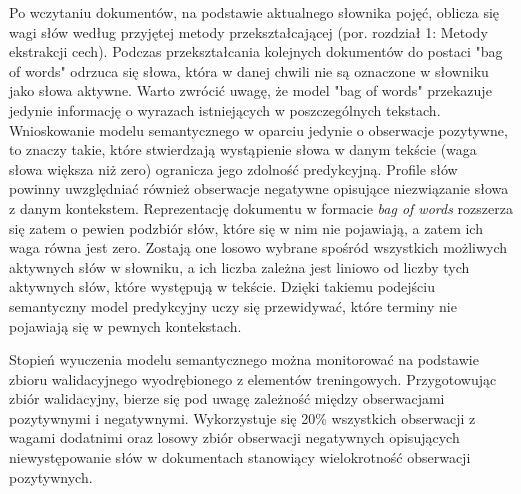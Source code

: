 \documentclass{pracamgr}
\begin{document}
Po wczytaniu dokumentów, na podstawie aktualnego słownika pojęć, oblicza się wagi słów według przyjętej metody przekształcającej (por. rozdział 1: Metody ekstrakcji cech). Podczas przekształcania kolejnych dokumentów do postaci "bag of words" odrzuca się słowa, która w danej chwili nie są oznaczone w słowniku jako słowa aktywne. Warto zwrócić uwagę, że model "bag of words" przekazuje jedynie informację o wyrazach istniejących w poszczególnych tekstach. Wnioskowanie modelu semantycznego w oparciu jedynie o obserwacje pozytywne, to znaczy takie, które stwierdzają wystąpienie słowa w danym tekście (waga słowa większa niż zero) ogranicza jego zdolność predykcyjną. Profile słów powinny uwzględniać również obserwacje negatywne opisujące niezwiązanie słowa z danym kontekstem. Reprezentację dokumentu w formacie \textit{bag of words} rozszerza się zatem o pewien podzbiór słów, które się w nim nie pojawiają, a zatem ich waga równa jest zero. Zostają one losowo wybrane spośród wszystkich możliwych aktywnych słów w słowniku, a ich liczba zależna jest liniowo od liczby tych aktywnych słów, które występują w tekście. Dzięki takiemu podejściu semantyczny model predykcyjny uczy się przewidywać, które terminy nie pojawiają się w pewnych kontekstach.

Stopień wyuczenia modelu semantycznego można monitorować na podstawie zbioru walidacyjnego wyodrębionego z elementów treningowych. Przygotowując zbiór walidacyjny, bierze się pod uwagę zależność między obserwacjami pozytywnymi i negatywnymi. Wykorzystuje się 20\% wszystkich obserwacji z wagami dodatnimi oraz losowy zbiór obserwacji negatywnych opisujących niewystępowanie słów w dokumentach stanowiący wielokrotność obserwacji pozytywnych.
\end{document}
